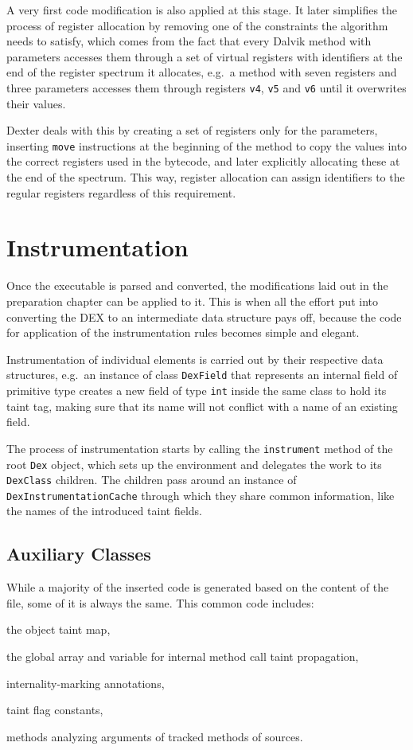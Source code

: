 \documentclass[12pt,twoside,notitlepage]{report}
\begin{document}
A very first code modification is also applied at this stage. It later simplifies the process of register allocation by removing one of the constraints the algorithm needs to satisfy, which comes from the fact that every Dalvik method with parameters accesses them through a set of virtual registers with identifiers at the end of the register spectrum it allocates, e.g.\ a method with seven registers and three parameters accesses them through registers \verb$v4$, \verb$v5$ and \verb$v6$ until it overwrites their values. 

Dexter deals with this by creating a set of registers only for the parameters, inserting \verb$move$ instructions at the beginning of the method to copy the values into the correct registers used in the bytecode, and later explicitly allocating these at the end of the spectrum. This way, register allocation can assign identifiers to the regular registers regardless of this requirement.

\section{Instrumentation}

Once the executable is parsed and converted, the modifications laid out in the preparation chapter can be applied to it. This is when all the effort put into converting the DEX to an intermediate data structure pays off, because the code for application of the instrumentation rules becomes simple and elegant. 

Instrumentation of individual elements is carried out by their respective data structures, e.g.\ an instance of class \verb$DexField$ that represents an internal field of primitive type creates a new field of type \verb$int$ inside the same class to hold its taint tag, making sure that its name will not conflict with a name of an existing field. 

The process of instrumentation starts by calling the \verb$instrument$ method of the root \verb$Dex$ object, which sets up the environment and delegates the work to its \verb$DexClass$ children. The children pass around an instance of \verb$DexInstrumentationCache$ through which they share common information, like the names of the introduced taint fields.

\subsection{Auxiliary Classes}

While a majority of the inserted code is generated based on the content of the file, some of it is always the same. This common code includes:
\begin{inparaenum}[(i)]
\item the object taint map,
\item the global array and variable for internal method call taint propagation,
\item internality-marking annotations,
\item taint flag constants,
\item methods analyzing arguments of tracked methods of sources.
\end{inparaenum}
\end{document}
